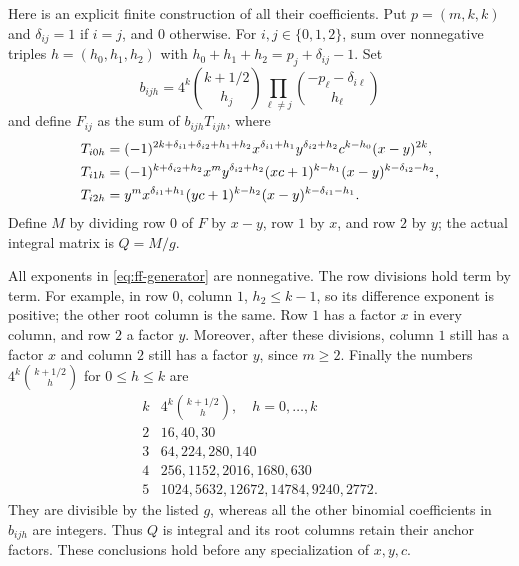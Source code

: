 \documentclass[12pt]{article}
\numberwithin{equation}{section}
\begin{document}
Here is an explicit finite construction of all their coefficients.
Put $p=(m,k,k)$ and $\delta_{ij}=1$ if $i=j$, and $0$ otherwise.
For $i,j\in\{0,1,2\}$, sum over nonnegative triples $h=(h_0,h_1,h_2)$
with $h_0+h_1+h_2=p_j+\delta_{ij}-1$. Set
\[
 b_{ijh}=4^k\binom{k+1/2}{h_j}
                 \prod_{\ell\ne j}\binom{-p_\ell-\delta_{i\ell}}{h_\ell}
\]
and define $F_{ij}$ as the sum of $b_{ijh}T_{ijh}$, where
\begin{align}
 T_{i0h}&=(-1)^{2k+\delta_{i1}+\delta_{i2}+h_1+h_2}
 x^{\delta_{i1}+h_1}y^{\delta_{i2}+h_2}
 c^{k-h_0}(x-y)^{2k},\notag\\
 T_{i1h}&=(-1)^{k+\delta_{i2}+h_2}
 x^m y^{\delta_{i2}+h_2}(xc+1)^{k-h_1}
 (x-y)^{k-\delta_{i2}-h_2},\label{eq:ff-generator}\\
 T_{i2h}&=y^m x^{\delta_{i1}+h_1}(yc+1)^{k-h_2}
 (x-y)^{k-\delta_{i1}-h_1}.\notag
\end{align}
Define $M$ by dividing row $0$ of $F$ by $x-y$, row $1$ by $x$,
and row $2$ by $y$; the actual integral matrix is $Q=M/g$.

All exponents in \eqref{eq:ff-generator} are nonnegative. The row
divisions hold term by term. For example, in row $0$, column $1$,
$h_2\le k-1$, so its difference exponent is positive; the other root
column is the same. Row $1$ has a factor $x$ in every column, and row
$2$ a factor $y$. Moreover, after these divisions, column $1$ still
has a factor $x$ and column $2$ still has a factor $y$, since $m\ge2$.
Finally the numbers $4^k\binom{k+1/2}{h}$ for $0\le h\le k$ are
\[
\begin{array}{c|l}
 k&4^k\binom{k+1/2}{h},\quad h=0,\ldots,k\\ \hline
 2&16,40,30\\
 3&64,224,280,140\\
 4&256,1152,2016,1680,630\\
 5&1024,5632,12672,14784,9240,2772.
\end{array}
\]
They are divisible by the listed $g$, whereas all the other binomial
coefficients in $b_{ijh}$ are integers. Thus $Q$ is integral and its
root columns retain their anchor factors. These conclusions hold
before any specialization of $x,y,c$.
\end{document}
